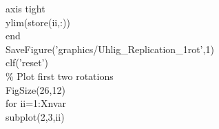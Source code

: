 \hspace{1mm}\hspace{5mm} \hspace{5mm} \hspace{5mm} \hspace{5mm} axis tight \\ 
\hspace{1mm}\hspace{5mm} \hspace{5mm} \hspace{5mm} \hspace{5mm} ylim(store(ii,:)) \\ 
\hspace{1mm}\hspace{5mm} \hspace{5mm} \hspace{5mm} \textcolor{matlabblue}{end} \\ 
\hspace{1mm}\hspace{5mm} \hspace{5mm} \hspace{5mm} SaveFigure(\textcolor{matlabpurple}{'graphics/Uhlig\_Replication\_1rot'},1) \\ 
\hspace{1mm}\hspace{5mm} \hspace{5mm} \hspace{5mm} clf(\textcolor{matlabpurple}{'reset'}) \\ 
\hspace{1mm}\hspace{5mm} \hspace{5mm} \hspace{5mm} \textcolor{matlabgreen}{\% Plot first two rotations }\\ 
\hspace{1mm}\hspace{5mm} \hspace{5mm} \hspace{5mm} FigSize(26,12) \\ 
\hspace{1mm}\hspace{5mm} \hspace{5mm} \hspace{5mm} \textcolor{matlabblue}{for} ii=1:Xnvar \\ 
\hspace{1mm}\hspace{5mm} \hspace{5mm} \hspace{5mm} \hspace{5mm} subplot(2,3,ii) \\ 
